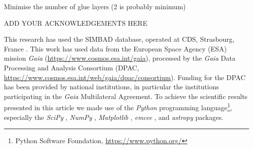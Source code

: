 \documentclass{aa}
\begin{document}
Minimise the number of glue layers (2 is probably minimum)



\begin{acknowledgements}

ADD YOUR ACKNOWLEDGEMENTS HERE

This research has used the SIMBAD database, operated at CDS, Strasbourg, France \citep{wenger2000}.
%
This work has used data from the European Space Agency (ESA) mission {\it Gaia} (\url{https://www.cosmos.esa.int/gaia}), processed by the {\it Gaia} Data Processing and Analysis Consortium (DPAC, \url{https://www.cosmos.esa.int/web/gaia/dpac/consortium}).
%
Funding for the DPAC has been provided by national institutions, in particular the institutions participating in the {\it Gaia} Multilateral Agreement.
%
To achieve the scientific results presented in this article we made use of the \emph{Python} programming language\footnote{Python Software Foundation, \url{https://www.python.org/}}, especially the \emph{SciPy} \citep{virtanen2020}, \emph{NumPy} \citep{numpy}, \emph{Matplotlib} \citep{Matplotlib}, \emph{emcee} \citep{foreman-mackey2013}, and \emph{astropy} \citep{astropy_1,astropy_2} packages.
%
\end{acknowledgements}



\end{document}
